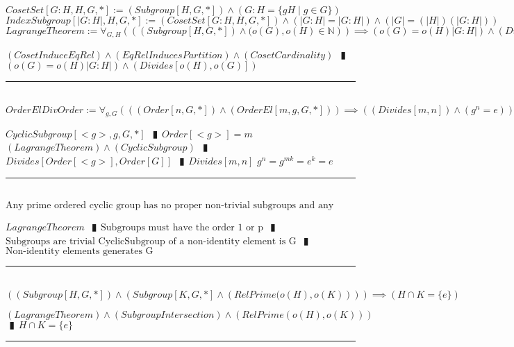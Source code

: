\documentclass{book}
\newcommand{\abr}{:=}
\newcommand{\pipe}{$\phantom{(}\vrectangleblack\phantom{)}$}
\newcommand{\pr}[1]{\left(#1\right)}
\newcommand{\st}{\mathbin{|}}
\begin{document}
$CosetSet[G : H, H, G, *] \abr (Subgroup[H, G, *]) \land (G : H = \{g H \st g \in G\})$ \\%
$IndexSubgroup[|G : H|, H, G, *] \abr (CosetSet[G : H, H, G, *]) \land (|G : H| = |G : H|) \land \pr{|G| = (|H|) (|G : H|)}$ \\

$LagrangeTheorem \abr \forall_{G, H}\pr{\pr{(Subgroup[H, G, *]) \land (o(G), o(H) \in \mathbb{N}}} \implies \pr{o(G) = o(H) |G: H|} \land \pr{Divides[o(H), o(G)]}$
\begin{enumerate}
  \lit $(CosetInduceEqRel) \land (EqRelInducesPartition) \land (CosetCardinality)$ \pipe $\pr{o(G) = o(H) |G: H|} \land \pr{Divides[o(H), o(G)]}$
\end{enumerate} \vspace{.75mm} \hrule \vspace{.75mm} \ \\

$OrderElDivOrder \abr \forall_{g, G}\pr{\pr{(Order[n, G, *]) \land (OrderEl[m, g, G, *])} \implies \pr{(Divides[m, n]) \land (g^n = e)}}$
\begin{enumerate}
  \lit $CyclicSubgroup[<g>, g, G, *]$ \pipe $Order[<g>] = m$
  \lit $(LagrangeTheorem) \land (CyclicSubgroup)$ \pipe $Divides[Order[<g>], Order[G]]$ \pipe $Divides[m, n]$
  \lit $g^n = g^{m k} = e ^k = e$
\end{enumerate} \vspace{.75mm} \hrule \vspace{.75mm} \ \\

$\text{Any prime ordered cyclic group has no proper non-trivial subgroups and any non-identity element is a generator.}$
\begin{enumerate}
  \lit $LagrangeTheorem$ \pipe $\text{Subgroups must have the order 1 or p}$ \pipe $\text{Subgroups are trivial}$
  \lit $\text{CyclicSubgroup of a non-identity element is G}$ \pipe $\text{Non-identity elements generates G}$
\end{enumerate} \vspace{.75mm} \hrule \vspace{.75mm} \ \\

$\pr{(Subgroup[H, G, *]) \land \pr{Subgroup[K, G, *] \land \pr{RelPrime(o(H), o(K)}}} \implies (H \cap K = \{e\})$
\begin{enumerate}
  \lit $(LagrangeTheorem) \land (SubgroupIntersection) \land \pr{RelPrime\pr{o(H), o(K)}}$ \pipe $H \cap K = \{e\}$
\end{enumerate} \vspace{.75mm} \hrule \vspace{.75mm} \ \\
\end{document}
